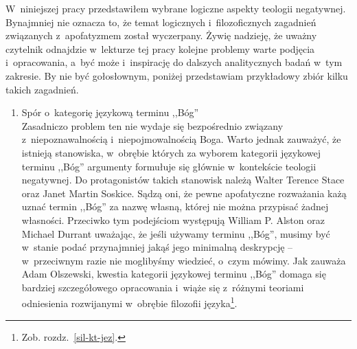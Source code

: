 W~niniejszej pracy przedstawiłem wybrane logiczne aspekty teologii negatywnej. Bynajmniej nie oznacza to, że temat logicznych i~filozoficznych zagadnień związanych z~apofatyzmem został wyczerpany. Żywię nadzieję, że uważny czytelnik odnajdzie w~lekturze tej pracy kolejne problemy warte podjęcia i~opracowania, a~być może i~inspirację do dalszych analitycznych badań w~tym zakresie. By nie być gołosłownym, poniżej przedstawiam przykładowy zbiór kilku takich zagadnień.

\begin{enumerate}[label = \arabic*), itemindent=6mm, labelwidth=4mm, labelsep=2mm, itemsep=1em, leftmargin=0mm]
\item Spór o~kategorię językową terminu ,,Bóg''\\
Zasadniczo problem ten nie wydaje się bezpośrednio związany z~niepoznawalnością i~niepojmowalnością Boga. Warto jednak zauważyć, że istnieją stanowiska, w~obrębie których za wyborem kategorii językowej terminu ,,Bóg'' argumenty formułuje się głównie w~kontekście teologii negatywnej. Do protagonistów takich stanowisk należą Walter Terence Stace oraz Janet Martin Soskice. Sądzą oni, że pewne apofatyczne rozważania każą uznać termin ,,Bóg'' za nazwę własną, której nie można przypisać żadnej własności. Przeciwko tym podejściom występują William P. Alston oraz Michael Durrant uważając, że jeśli używamy terminu ,,Bóg'', musimy być w~stanie podać przynajmniej jakąś jego minimalną deskrypcję -- w~przeciwnym razie nie moglibyśmy wiedzieć, o~czym mówimy. Jak zauważa Adam Olszewski, kwestia kategorii językowej terminu ,,Bóg'' domaga się bardziej szczegółowego opracowania i~wiąże się z~różnymi teoriami odniesienia rozwijanymi w~obrębie filozofii języka\footnote{Zob. rozdz.~\ref{sil-kt-jez}.}.


\end{enumerate}

